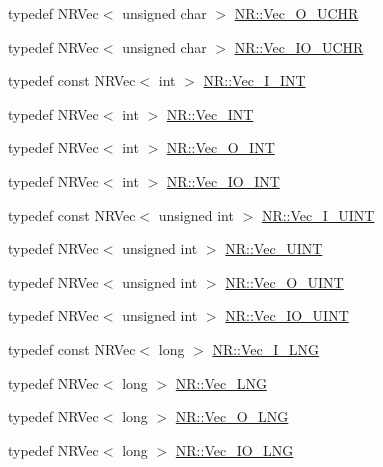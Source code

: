 \begin{DoxyCompactItemize}
\item 
typedef N\+R\+Vec$<$ unsigned char $>$ \mbox{\hyperlink{namespaceNR_ac322e5f1208609bf101390ed2495b7d5}{N\+R\+::\+Vec\+\_\+\+O\+\_\+\+U\+C\+HR}}
\item 
typedef N\+R\+Vec$<$ unsigned char $>$ \mbox{\hyperlink{namespaceNR_ad0cd08c957bbfcd9b612069da683fed4}{N\+R\+::\+Vec\+\_\+\+I\+O\+\_\+\+U\+C\+HR}}
\item 
typedef const N\+R\+Vec$<$ int $>$ \mbox{\hyperlink{namespaceNR_ae67ce7dc86a8a64a7ce73c3c030ff610}{N\+R\+::\+Vec\+\_\+\+I\+\_\+\+I\+NT}}
\item 
typedef N\+R\+Vec$<$ int $>$ \mbox{\hyperlink{namespaceNR_a8ee8e979fd889af3f190d7f678756f24}{N\+R\+::\+Vec\+\_\+\+I\+NT}}
\item 
typedef N\+R\+Vec$<$ int $>$ \mbox{\hyperlink{namespaceNR_ade2338f6d53b7da3dd6d1c04804541f2}{N\+R\+::\+Vec\+\_\+\+O\+\_\+\+I\+NT}}
\item 
typedef N\+R\+Vec$<$ int $>$ \mbox{\hyperlink{namespaceNR_a3b8558419263875cc467f92b0ef4aba7}{N\+R\+::\+Vec\+\_\+\+I\+O\+\_\+\+I\+NT}}
\item 
typedef const N\+R\+Vec$<$ unsigned int $>$ \mbox{\hyperlink{namespaceNR_afd875cd4a9ff5a070ac7b7e5d5e6d145}{N\+R\+::\+Vec\+\_\+\+I\+\_\+\+U\+I\+NT}}
\item 
typedef N\+R\+Vec$<$ unsigned int $>$ \mbox{\hyperlink{namespaceNR_a891b8cd2a3c0e5ce8bd7c605dba2bdd1}{N\+R\+::\+Vec\+\_\+\+U\+I\+NT}}
\item 
typedef N\+R\+Vec$<$ unsigned int $>$ \mbox{\hyperlink{namespaceNR_aa2c2f818c1de114f74a2c3ea1f639da4}{N\+R\+::\+Vec\+\_\+\+O\+\_\+\+U\+I\+NT}}
\item 
typedef N\+R\+Vec$<$ unsigned int $>$ \mbox{\hyperlink{namespaceNR_a2da77c23b3ef6c69b5ad3971441ea6bc}{N\+R\+::\+Vec\+\_\+\+I\+O\+\_\+\+U\+I\+NT}}
\item 
typedef const N\+R\+Vec$<$ long $>$ \mbox{\hyperlink{namespaceNR_ad78c9dbf732a4dd8cb20450b729296a1}{N\+R\+::\+Vec\+\_\+\+I\+\_\+\+L\+NG}}
\item 
typedef N\+R\+Vec$<$ long $>$ \mbox{\hyperlink{namespaceNR_a815b8cf6e3ded65e3394a3f631d9d2e2}{N\+R\+::\+Vec\+\_\+\+L\+NG}}
\item 
typedef N\+R\+Vec$<$ long $>$ \mbox{\hyperlink{namespaceNR_a1260716c95164012314152d97535c2fa}{N\+R\+::\+Vec\+\_\+\+O\+\_\+\+L\+NG}}
\item 
typedef N\+R\+Vec$<$ long $>$ \mbox{\hyperlink{namespaceNR_ab3ee168d5645ca3b231102152fc5a433}{N\+R\+::\+Vec\+\_\+\+I\+O\+\_\+\+L\+NG}}
\item 

\end{DoxyCompactItemize}
